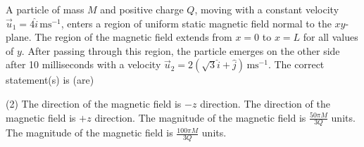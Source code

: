 
\item A particle of mass \( M \) and positive charge \( Q \), moving with a constant velocity \( \vec{u}_1 = 4\hat{i} \, \text{ms}^{-1} \), enters a region of uniform static magnetic field normal to the \( xy \)-plane. The region of the magnetic field extends from \( x = 0 \) to \( x = L \) for all values of \( y \). After passing through this region, the particle emerges on the other side after 10 milliseconds with a velocity \( \vec{u}_2 = 2(\sqrt{3}\hat{i} + \hat{j}) \, \text{ms}^{-1} \). The correct statement(s) is (are)
    \begin{tasks}(2)
        \task The direction of the magnetic field is \(-z\) direction.
        \task The direction of the magnetic field is \(+z\) direction.
        \task The magnitude of the magnetic field is \( \frac{50 \pi M}{3Q} \) units.
        \task The magnitude of the magnetic field is \( \frac{100 \pi M}{3Q} \) units.
    \end{tasks}
